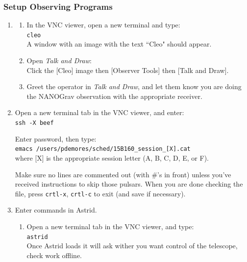 \documentclass[11pt, reqno, tbtags]{article}
\begin{document}
\subsubsection{Setup Observing Programs}\label{VNC:stuff} %
\begin{enumerate}
 \item \begin{enumerate} %
  \item\label{cleo:stuff} In the VNC viewer, open a new terminal and type: \\ %
  \texttt{cleo} \\
  A window with an image with the text ``Cleo" should appear. 
  \item Open \textit{Talk and Draw}: \\
  Click the [Cleo] image then [Observer Tools] then [Talk and Draw]. %
  \item Greet the operator in \textit{Talk and Draw}, and let them know you are doing the NANOGrav observation with the appropriate receiver.  %
 \end{enumerate}
 \item Open a new terminal tab in the VNC viewer, and enter: \\  %
 \texttt{ssh -X beef} 
 
 Enter password, then type: \\
 \texttt{emacs /users/pdemores/sched/15B160\_session\_[X].cat} \\                         
 where [X] is the appropriate session letter (A, B, C, D, E, or F).                                

 Make sure no lines are commented out (with \#'s in front) unless you've received instructions to skip those pulsars. When you are done checking the file, press \texttt{crtl-x}, \texttt{crtl-c} to exit (and save if necessary).  

 \item Enter commands in Astrid. \begin{enumerate}  %
  \item Open a new terminal tab in the VNC viewer, and type: \\  %
  \texttt{astrid} \\
  Once Astrid loads it will ask wither you want control of the telescope, check work offline.


\end{enumerate}
\end{enumerate}
\end{document}
